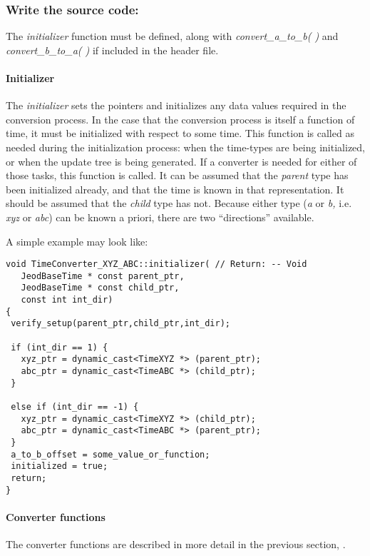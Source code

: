 \subsubsection[\ Write the source code:]{ Write the source code:}
The \textit{initializer} function must be defined, along with
\textit{convert\_a\_to\_b( ) }and \textit{convert\_b\_to\_a( ) } if
included in the header file.  




\paragraph{Initializer}
The \textit{initializer} sets the pointers and initializes any data
values required in the conversion process.  In the case that the
conversion process is itself a function of time, it must be initialized
with respect to some time.  This function is called as needed during
the initialization process: when the time-types are being initialized,
or when the update tree is being generated.  If a converter is needed
for either of those tasks, this function is called.  It can be assumed
that the \textit{parent }type has been initialized already, and that
the time is known in that representation.  It should be assumed that
the \textit{child} type has not.  Because either type (\textit{a }or
\textit{b, }i.e.\textit{ xyz }or\textit{ abc})\textit{ }can be known a
priori, there are two {\textquotedblleft}directions{\textquotedblright}
available.

A simple example may look like:

\begin{verbatim}
void TimeConverter_XYZ_ABC::initializer( // Return: -- Void
   JeodBaseTime * const parent_ptr, 
   JeodBaseTime * const child_ptr,  
   const int int_dir)  
{ 
 verify_setup(parent_ptr,child_ptr,int_dir);

 if (int_dir == 1) { 
   xyz_ptr = dynamic_cast<TimeXYZ *> (parent_ptr);
   abc_ptr = dynamic_cast<TimeABC *> (child_ptr);
 }

 else if (int_dir == -1) {
   xyz_ptr = dynamic_cast<TimeXYZ *> (child_ptr);
   abc_ptr = dynamic_cast<TimeABC *> (parent_ptr);
 }
 a_to_b_offset = some_value_or_function;
 initialized = true;  
 return; 
}
\end{verbatim}

\paragraph{Converter functions}
The converter functions are described in more detail in the previous
section, .

